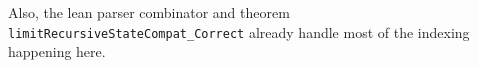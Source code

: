 Also, the lean parser combinator and theorem
\texttt{limitRecursiveStateCompat\_Correct} already handle most of the indexing
happening here.

